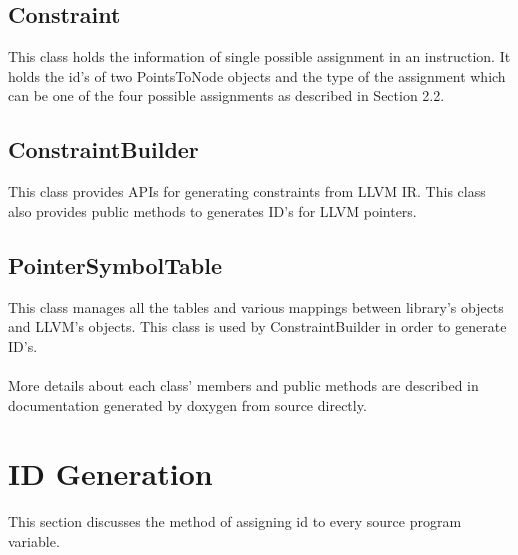 \documentclass[a4paper,11pt]{report}
\begin{document}
\subsection{Constraint}
This class holds the information of single possible assignment in an 
instruction. It holds the id's of two PointsToNode objects and the type of the 
assignment which can be one of the four possible assignments as described 
in Section 2.2.

\subsection{ConstraintBuilder}
This class provides APIs for generating constraints from LLVM IR. This class 
also provides public methods to generates ID's for LLVM pointers.

\subsection{PointerSymbolTable}
This class manages all the tables and various mappings between library's 
objects and LLVM's objects. This class is used by ConstraintBuilder in order to 
generate ID's.

\paragraph{}
More details about each class' members and public methods are described in 
documentation generated by doxygen from source directly.

\section{ID Generation}
This section discusses the method of assigning id to every source program 
variable.
\end{document}
